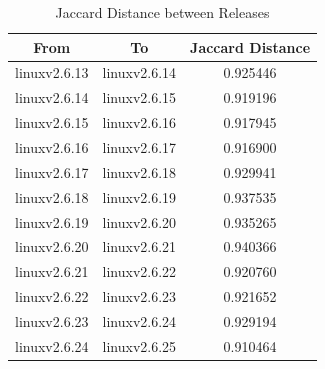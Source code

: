 \documentclass{acm_proc_article-sp}
\begin{document}
\begin{table}[ht]
\caption{Jaccard Distance between Releases}  %
\centering 						%
\begin{tabular}{c c c}				%
\hline\hline						%
From 				& To		& Jaccard Distance	\\ [0.5ex]
\hline 							%
linuxv2.6.13			& linuxv2.6.14		& 0.925446	\\
linuxv2.6.14			& linuxv2.6.15		& 0.919196	\\
linuxv2.6.15			& linuxv2.6.16		& 0.917945	\\
linuxv2.6.16			& linuxv2.6.17		& 0.916900 	\\
linuxv2.6.17			& linuxv2.6.18		& 0.929941 	\\
linuxv2.6.18			& linuxv2.6.19		& 0.937535	\\
linuxv2.6.19			& linuxv2.6.20		& 0.935265 	\\
linuxv2.6.20			& linuxv2.6.21		& 0.940366 	\\
linuxv2.6.21			& linuxv2.6.22		& 0.920760 	\\
linuxv2.6.22			& linuxv2.6.23		& 0.921652 	\\
linuxv2.6.23			& linuxv2.6.24		& 0.929194 	\\
linuxv2.6.24			& linuxv2.6.25		& 0.910464 	\\
[1ex]							%
\hline 							%
\end{tabular}
\label{table:nonlin} 				%
\end{table}
\end{document}
